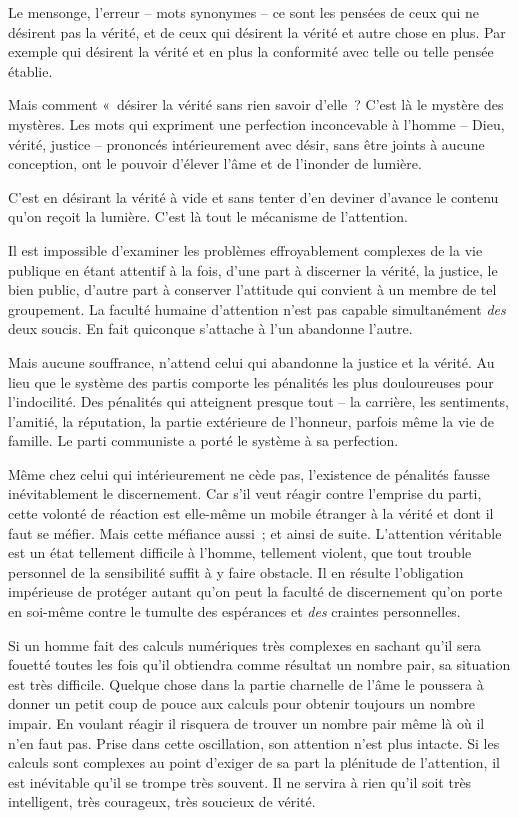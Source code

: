 \documentclass[french,twoside]{book} %
\begin{document}
Le mensonge, l’erreur – mots synonymes – ce sont les pensées de ceux qui ne désirent pas la vérité, et de ceux qui désirent la vérité et autre chose en plus. Par exemple qui désirent la vérité et en plus la conformité avec telle ou telle pensée établie.\par
Mais comment « désirer la vérité sans rien savoir d’elle ? C’est là le mystère des mystères. Les mots qui expriment une perfection inconcevable à l’homme – Dieu, vérité, justice – prononcés intérieurement avec désir, sans être joints à aucune conception, ont le pouvoir d’élever l’âme et de l’inonder de lumière.\par
C’est en désirant la vérité à vide et sans tenter d’en deviner d’avance le contenu qu’on reçoit la lumière. C’est là tout le mécanisme de l’attention.\par
Il est impossible d’examiner les problèmes effroyablement complexes de la vie publique en étant attentif à la fois, d’une part à discerner la vérité, la justice, le bien public, d’autre part à conserver l’attitude qui convient à un membre de tel groupement. La faculté humaine d’attention n’est pas capable simultanément \emph{des} deux soucis. En fait quiconque s’attache à l’un abandonne l’autre.\par
Mais aucune souffrance, n’attend celui qui abandonne la justice et la vérité. Au lieu que le système des partis comporte les pénalités les plus douloureuses pour l’indocilité. Des pénalités qui atteignent presque tout – la carrière, les sentiments, l’amitié, la réputation, la partie extérieure de l’honneur, parfois même la vie de famille. Le parti communiste a porté le système à sa perfection.\par
Même chez celui qui intérieurement ne cède pas, l’existence de pénalités fausse inévitablement le discernement. Car s’il veut réagir contre l’emprise du parti, cette volonté de réaction est elle-même un mobile étranger à la vérité et dont il faut se méfier. Mais cette méfiance aussi ; et ainsi de suite. L’attention véritable est un état tellement difficile à l’homme, tellement violent, que tout trouble personnel de la sensibilité suffit à y faire obstacle. Il en résulte l’obligation impérieuse de protéger autant qu’on peut la faculté de discernement qu’on porte en soi-même contre le tumulte des espérances et \emph{des} craintes personnelles.\par
Si un homme fait des calculs numériques très complexes en sachant qu’il sera fouetté toutes les fois qu’il obtiendra comme résultat un nombre pair, sa situation est très difficile. Quelque chose dans la partie charnelle de l’âme le poussera à donner un petit coup de pouce aux calculs pour obtenir toujours un nombre impair. En voulant réagir il risquera de trouver un nombre pair même là où il n’en faut pas. Prise dans cette oscillation, son attention n’est plus intacte. Si les calculs sont complexes au point d’exiger de sa part la plénitude de l’attention, il est inévitable qu’il se trompe très souvent. Il ne servira à rien qu’il soit très intelligent, très courageux, très soucieux de vérité.\par
\end{document}
